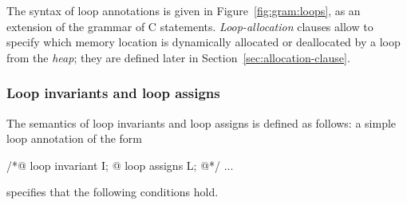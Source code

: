The syntax of loop annotations is given in Figure~\ref{fig:gram:loops},
as an extension of the grammar of C statements.
\textsl{Loop-allocation} clauses allow to specify which memory location 
is dynamically allocated or deallocated by a loop from the \textsl{heap}; 
they are defined later in Section~\ref{sec:allocation-clause}.

\subsubsection{Loop invariants and loop assigns}
\label{sec:loop-invariants}
The semantics of loop invariants and loop assigns is defined as follows: 
a simple loop annotation of the form
\begin{listing}{1}
/*@ loop invariant I;
  @ loop assigns L;
  @*/
...
\end{listing}
specifies that the following conditions hold.
